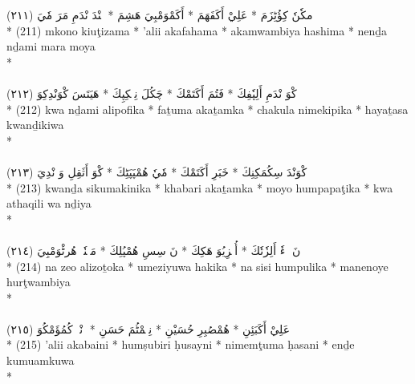 \documentclass[a4paper, 12pt]{report}
\begin{document}
\begin{center}
\textarabic{(٢١١) \textcolor{mygreen}{مكٗنٗ كِؤُٹِزَمَ  * عَلِيْ أَكَفَهَمَ  * أَكَمْوَمْبِيَ هَشِمَ  * نٖنْدَ نْدَمِ مَرَ مٗيَ }} \\* 
(211) mkono kiuţizama  * 'alii akafahama  * akamwambiya hashima  * nenḏa nḏami mara moya  \\* 
 \\ 
\\[8mm] 

\textarabic{(٢١٢) \textcolor{mygreen}{كْوَ نْدَمِ أَلِپٗفِكَ  * فَتُمَ أَكَتَمْكَ  * چَكُلَ نِمٖكِپِكَ  * هَيَتَسَ كْوَنْدِكِوَ }} \\* 
(212) kwa nḏami alipofika  * faṯuma akaṯamka  * chakula nimekipika  * hayaṯasa kwanḏikiwa  \\* 
 \\ 
\\[8mm] 

\textarabic{(٢١٣) \textcolor{mygreen}{كْوَنْدَ سِكُمَكِنِكَ  * خَبَرِ أَكَتَمْكَ  * مٗيٗ هُمْپَپَٹِكَ  * كْوَ أَثَقِلِ وَ نْدِيَ }} \\* 
(213) kwanḏa sikumakinika  * khabari akaṯamka  * moyo humpapaţika  * kwa athaqili wa nḏiya  \\* 
 \\ 
\\[8mm] 

\textarabic{(٢١٤) \textcolor{mygreen}{نَ زٖءٗ أَلِزٗتٗكَ  * أُمٖزِيُوَ هَكِكَ  * نَ سِسِ هُمْپُلِكَ  * مَنٖنٗيٖ هُرٹْوَمْبِيَ }} \\* 
(214) na zeo alizoṯoka  * umeziyuwa hakika  * na sisi humpulika  * manenoye hurţwambiya  \\* 
 \\ 
\\[8mm] 

\textarabic{(٢١٥) \textcolor{mygreen}{عَلِيْ أَكَبَئِنِ  * هُمْصُبِرِ حُسَيْنِ  * نِمٖمْٹُمَ حَسَنِ  * إٖنْدٖ كُمُؤَمْكُوَ }} \\* 
(215) 'alii akabaini  * humṣubiri ḥusayni  * nimemţuma ḥasani  * enḏe kumuamkuwa  \\* 
 \\ 
\\[8mm] 


\end{center}
\end{document}
